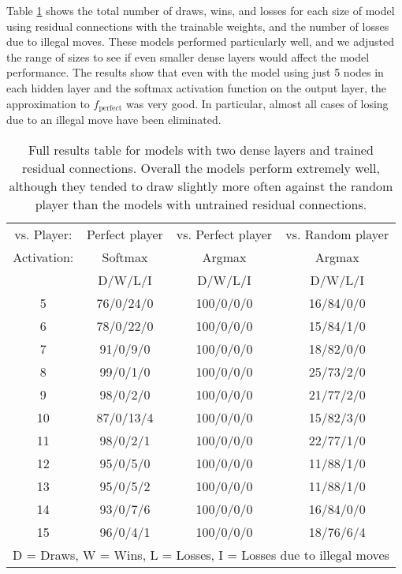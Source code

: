 \documentclass{somasmsc}
\begin{document}
\begin{exa}
Table \ref{ox:t3} shows the total number of draws, wins, and losses for each size of model using residual connections with the trainable weights, and the number of losses due to illegal moves. These models performed particularly well, and we adjusted the range of sizes to see if even smaller dense layers would affect the model performance. The results show that even with the model using just 5 nodes in each hidden layer and the softmax activation function on the output layer, the approximation to $f_{\text{perfect}}$ was very good. In particular, almost all cases of losing due to an illegal move have been eliminated.

\begin{table}[h!]
\centering
\begin{tabular}{ |c|c|c|c| }
 \hline
  vs. Player: & Perfect player & vs. Perfect player & vs. Random player \\
  Activation: & Softmax & Argmax & Argmax \\
  & D/W/L/I & D/W/L/I & D/W/L/I \\
 \hline
 5  & 76/0/24/0 & 100/0/0/0 & 16/84/0/0 \\
 6  & 78/0/22/0 & 100/0/0/0 & 15/84/1/0 \\
 7  & 91/0/9/0  & 100/0/0/0 & 18/82/0/0 \\
 8  & 99/0/1/0  & 100/0/0/0 & 25/73/2/0 \\
 9  & 98/0/2/0  & 100/0/0/0 & 21/77/2/0 \\
 10 & 87/0/13/4 & 100/0/0/0 & 15/82/3/0 \\
 11 & 98/0/2/1  & 100/0/0/0 & 22/77/1/0 \\
 12 & 95/0/5/0  & 100/0/0/0 & 11/88/1/0 \\
 13 & 95/0/5/2  & 100/0/0/0 & 11/88/1/0 \\
 14 & 93/0/7/6  & 100/0/0/0 & 16/84/0/0 \\
 15 & 96/0/4/1  & 100/0/0/0 & 18/76/6/4 \\
 \hline
 \multicolumn{4}{|c|}{D = Draws, W = Wins, L = Losses, I = Losses due to illegal moves} \\
 \hline
\end{tabular}
\caption{Full results table for models with two dense layers and trained residual connections. Overall the models perform extremely well, although they tended to draw slightly more often against the random player than the models with untrained residual connections.}
\label{ox:t3}
\end{table}


\end{exa}
\end{document}
